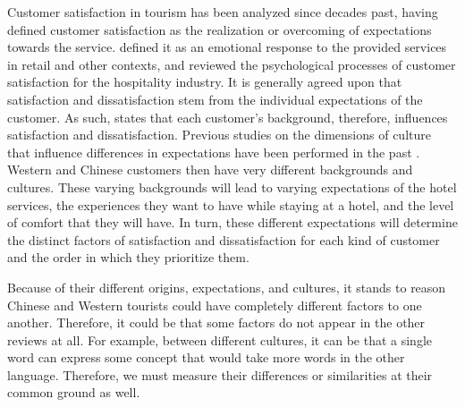 \documentclass[smallextended,natbib]{svjour3}       %
\begin{document}
    Customer satisfaction in tourism has been analyzed since decades past, \cite{hunt1975} having defined customer satisfaction as the realization or overcoming of expectations towards the service. \cite{oliver1981} defined it as an emotional response to the provided services in retail and other contexts, and \cite{oh1996} reviewed the psychological processes of customer satisfaction for the hospitality industry. It is generally agreed upon that satisfaction and dissatisfaction stem from the individual expectations of the customer. As such, \cite{engel1990} states that each customer's background, therefore, influences satisfaction and dissatisfaction. Previous studies on the dimensions of culture that influence differences in expectations have been performed in the past \cite{donthu1998cultural}. Western and Chinese customers then have very different backgrounds and cultures. These varying backgrounds will lead to varying expectations of the hotel services, the experiences they want to have while staying at a hotel, and the level of comfort that they will have. In turn, these different expectations will determine the distinct factors of satisfaction and dissatisfaction for each kind of customer and the order in which they prioritize them. 

    Because of their different origins, expectations, and cultures, it stands to reason Chinese and Western tourists could have completely different factors to one another. Therefore, it could be that some factors do not appear in the other reviews at all. For example, between different cultures, it can be that a single word can express some concept that would take more words in the other language. Therefore, we must measure their differences or similarities at their common ground as well.
\end{document}
